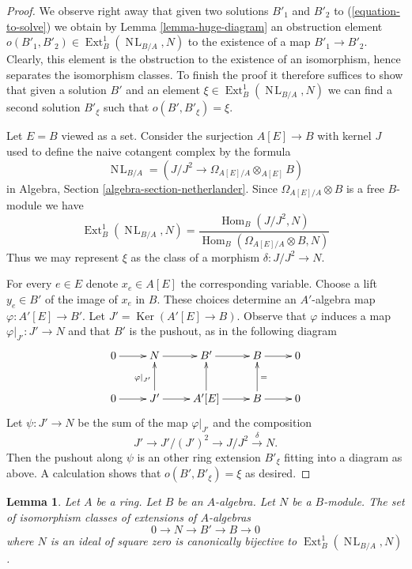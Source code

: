 \documentclass{stacks-project}
\theoremstyle{plain}
\newtheorem{lemma}[subsection]{Lemma}
\theoremstyle{definition}
\theoremstyle{remark}
\numberwithin{equation}{subsection}
\def\Hom{\mathop{\mathrm{Hom}}\nolimits}
\def\Ext{\mathop{\mathrm{Ext}}\nolimits}
\def\NL{\mathop{N\!L}\nolimits}
\def\Ker{\mathop{\mathrm{Ker}}}
\begin{document}
\begin{proof}
We observe right away that given two solutions $B'_1$ and $B'_2$
to (\ref{equation-to-solve}) we obtain by Lemma \ref{lemma-huge-diagram} an
obstruction element $o(B'_1, B'_2) \in \Ext^1_B(\NL_{B/A}, N)$
to the existence of a map $B'_1 \to B'_2$. Clearly, this element
is the obstruction to the existence of an isomorphism, hence separates
the isomorphism classes. To finish the proof it therefore suffices to
show that given a solution $B'$ and an element
$\xi \in \Ext^1_B(\NL_{B/A}, N)$
we can find a second solution $B'_\xi$ such that
$o(B', B'_\xi) = \xi$.

\medskip\noindent
Let $E = B$ viewed as a set. Consider the surjection $A[E] \to B$ with kernel
$J$ used to define the naive cotangent complex by the formula
$$
\NL_{B/A} = (J/J^2 \to \Omega_{A[E]/A} \otimes_{A[E]} B)
$$
in Algebra, Section \ref{algebra-section-netherlander}.
Since $\Omega_{A[E]/A} \otimes B$ is a free $B$-module we have
$$
\Ext^1_B(\NL_{B/A}, N) =
\frac{\Hom_B(J/J^2, N)}
{\Hom_B(\Omega_{A[E]/A} \otimes B, N)}
$$
Thus we may represent $\xi$ as the class of a morphism $\delta : J/J^2 \to N$.

\medskip\noindent
For every $e \in E$ denote $x_e \in A[E]$ the corresponding variable.
Choose a lift $y_e \in B'$ of the image of $x_e$ in $B$.
These choices determine an $A'$-algebra map $\varphi : A'[E] \to B'$.
Let $J' = \Ker(A'[E] \to B)$. Observe that $\varphi$ induces a map
$\varphi|_{J'} : J' \to N$ and that $B'$ is the pushout, as in the following
diagram
$$
\xymatrix{
0 \ar[r] & N \ar[r] & B' \ar[r] & B \ar[r] & 0 \\
0 \ar[r] & J' \ar[u]^{\varphi|_{J'}} \ar[r] & A'[E] \ar[u] \ar[r] &
B \ar[u]_{=} \ar[r] & 0
}
$$
Let $\psi : J' \to N$ be the sum of the map $\varphi|_{J'}$ and the
composition
$$
J' \to J'/(J')^2 \to J/J^2 \xrightarrow{\delta} N.
$$
Then the pushout along $\psi$ is an other ring extension $B'_\xi$
fitting into a diagram as above. A calculation shows that
$o(B', B'_\xi) = \xi$ as desired.
\end{proof}

\begin{lemma}
\label{lemma-extensions-of-algebras}
Let $A$ be a ring. Let $B$ be an $A$-algebra. Let $N$ be a $B$-module.
The set of isomorphism classes of extensions of $A$-algebras
$$
0 \to N \to B' \to B \to 0
$$
where $N$ is an ideal of square zero is canonically bijective to
$\Ext^1_B(\NL_{B/A}, N)$.
\end{lemma}
\end{document}

